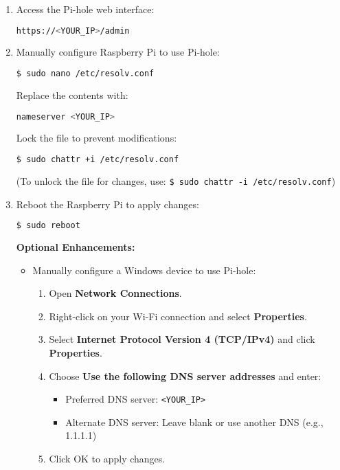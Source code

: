 \begin{enumerate}
\item Access the Pi-hole web interface:
\begin{lstlisting}[language=bash, breaklines=true, breakatwhitespace=true, columns=fullflexible]
https://<YOUR_IP>/admin
\end{lstlisting}

\item Manually configure Raspberry Pi to use Pi-hole:
\begin{lstlisting}[language=bash, breaklines=true, breakatwhitespace=true, columns=fullflexible]
$ sudo nano /etc/resolv.conf
\end{lstlisting}

Replace the contents with:
\begin{lstlisting}[language=bash, breaklines=true, breakatwhitespace=true, columns=fullflexible]
nameserver <YOUR_IP>
\end{lstlisting}

Lock the file to prevent modifications:
\begin{lstlisting}[language=bash, breaklines=true, breakatwhitespace=true, columns=fullflexible]
$ sudo chattr +i /etc/resolv.conf
\end{lstlisting}
 
(To unlock the file for changes, use: \texttt{\$ sudo chattr -i /etc/resolv.conf})

\item Reboot the Raspberry Pi to apply changes:
\begin{lstlisting}[language=bash, breaklines=true, breakatwhitespace=true, columns=fullflexible]
$ sudo reboot
\end{lstlisting}

\noindent \textbf{Optional Enhancements:}
\begin{itemize}

\item Manually configure a Windows device to use Pi-hole:
\begin{enumerate}
\item Open \textbf{Network Connections}.
\item Right-click on your Wi-Fi connection and select \textbf{Properties}.
\item Select \textbf{Internet Protocol Version 4 (TCP/IPv4)} and click \textbf{Properties}.
\item Choose \textbf{Use the following DNS server addresses} and enter:
\begin{itemize}
\item Preferred DNS server: \texttt{\textless YOUR\_IP\textgreater}
\item Alternate DNS server: Leave blank or use another DNS (e.g., 1.1.1.1)
\end{itemize}
\item Click OK to apply changes.
\end{enumerate}

\end{itemize}

\end{enumerate}